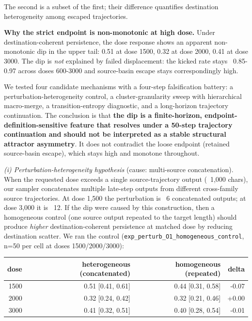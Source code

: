 \documentclass{article}
\theoremstyle{plain}
\theoremstyle{definition}
\begin{document}
The second is a subset of the first; their difference quantifies destination heterogeneity among escaped trajectories.

\textbf{Why the strict endpoint is non-monotonic at high dose.} Under destination-coherent persistence, the dose response shows an apparent non-monotonic dip in the upper tail: 0.51 at dose 1500, 0.32 at dose 2000, 0.41 at dose 3000. The dip is \textit{not} explained by failed displacement: the kicked rate stays ~0.85-0.97 across doses 600-3000 and source-basin escape stays correspondingly high.

We tested four candidate mechanisms with a four-step falsification battery: a perturbation-heterogeneity control, a cluster-granularity sweep with hierarchical macro-merge, a transition-entropy diagnostic, and a long-horizon trajectory continuation. The conclusion is that \textbf{the dip is a finite-horizon, endpoint-definition-sensitive feature that resolves under a 50-step trajectory continuation and should not be interpreted as a stable structural attractor asymmetry}. It does not contradict the loose endpoint (retained source-basin escape), which stays high and monotone throughout.

\textit{(i) Perturbation-heterogeneity hypothesis} (cause: multi-source concatenation). When the requested dose exceeds a single source-trajectory output (~1,000 chars), our sampler concatenates multiple late-step outputs from different cross-family source trajectories. At dose 1,500 the perturbation is ~6 concatenated outputs; at dose 3,000 it is ~12. If the dip were caused by this construction, then a homogeneous control (one source output repeated to the target length) should produce \textit{higher} destination-coherent persistence at matched dose by reducing destination scatter. We ran the control (\texttt{exp\_perturb\_O1\_homogeneous\_control}, n=50 per cell at doses 1500/2000/3000):

\begin{table}[h!]
\centering
\small
\begin{tabular}{rrrr}
\toprule
dose & heterogeneous (concatenated) & homogeneous (repeated) & delta \\
\midrule
1500 & 0.51 [0.41, 0.61] & 0.44 [0.31, 0.58] & -0.07 \\
2000 & 0.32 [0.24, 0.42] & 0.32 [0.21, 0.46] & +0.00 \\
3000 & 0.41 [0.32, 0.51] & 0.40 [0.28, 0.54] & -0.01 \\
\bottomrule
\end{tabular}
\end{table}
\end{document}
